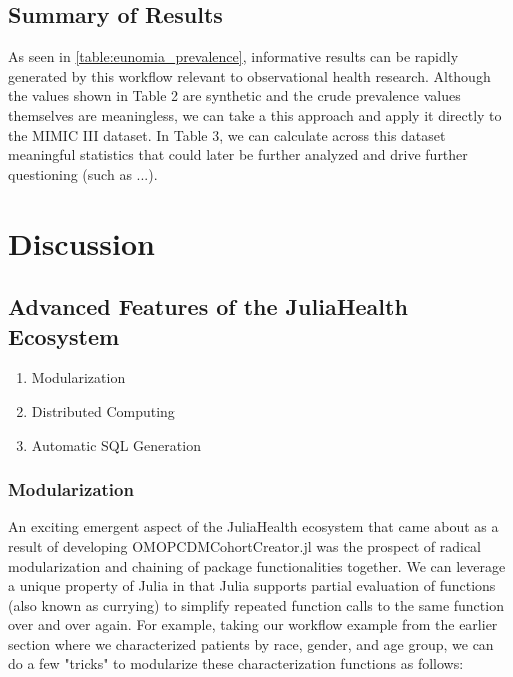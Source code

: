 \documentclass{juliacon}
\begin{document}
\subsection{Summary of Results}

As seen in \ref{table:eunomia_prevalence}, informative results can be rapidly generated by this workflow relevant to observational health research.
Although the values shown in Table 2 are synthetic and the crude prevalence values themselves are meaningless, we can take a this approach and apply it directly to the MIMIC III dataset.
In Table 3, we can calculate across this dataset meaningful statistics that could later be further analyzed and drive further questioning (such as ...).

\section{Discussion}

\subsection{Advanced Features of the JuliaHealth Ecosystem}

\begin{enumerate}

\item Modularization

\item Distributed Computing

\item Automatic SQL Generation

\end{enumerate}

\subsubsection{Modularization}

An exciting emergent aspect of the JuliaHealth ecosystem that came about as a result of developing OMOPCDMCohortCreator.jl was the prospect of radical modularization and chaining of package functionalities together.
We can leverage a unique property of Julia in that Julia supports partial evaluation of functions (also known as currying) to simplify repeated function calls to the same function over and over again.
For example, taking our workflow example from the earlier section where we characterized patients by race, gender, and age group, we can do a few "tricks" to modularize these characterization functions as follows:
\end{document}
